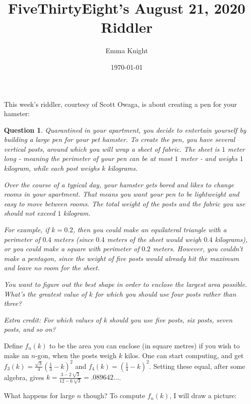 \documentclass[11pt]{article}
\title{FiveThirtyEight's August 21, 2020 Riddler}
\author{Emma Knight}
\date{\today}
\newtheorem{question}[theorem]{Question}
\theoremstyle{definition}
\begin{document}
\maketitle
This week's riddler, courtesy of Scott Owaga, is about creating a pen for your hamster:
\begin{question}
Quarantined in your apartment, you decide to entertain yourself by building a large pen for your pet hamster. To create the pen, you have several vertical posts, around which you will wrap a sheet of fabric. The sheet is $1$ meter long - meaning the perimeter of your pen can be at most $1$ meter - and weighs $1$ kilogram, while each post weighs $k$ kilograms.

Over the course of a typical day, your hamster gets bored and likes to change rooms in your apartment. That means you want your pen to be lightweight and easy to move between rooms. The total weight of the posts and the fabric you use should not exceed $1$ kilogram.

For example, if $k = 0.2$, then you could make an equilateral triangle with a perimeter of $0.4$ meters (since $0.4$ meters of the sheet would weigh $0.4$ kilograms), or you could make a square with perimeter of $0.2$ meters. However, you couldn’t make a pentagon, since the weight of five posts would already hit the maximum and leave no room for the sheet.

You want to figure out the best shape in order to enclose the largest area possible. What’s the greatest value of $k$ for which you should use four posts rather than three?

\emph{Extra credit}: For which values of k should you use five posts, six posts, seven posts, and so on?
\end{question}
Define $f_n(k)$ to be the area you can enclose (in square metres) if you wish to make an $n$-gon, when the posts weigh $k$ kilos.  One can start computing, and get $f_3(k) = \frac{\sqrt{3}}{4}\left(\frac{1}{3}-k\right)^2$ and $f_4(k) = \left(\frac{1}{4} - k\right)^2$.  Setting these equal, after some algebra, gives $k = \frac{3-2\sqrt[4]{3}}{12-6\sqrt[4]{3}} = .089642\ldots$.

What happens for large $n$ though?  To compute $f_n(k)$, I will draw a picture:

\end{document}
